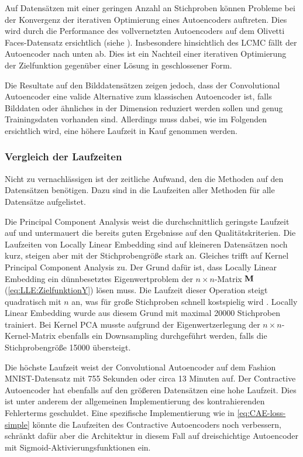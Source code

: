 Auf Datensätzen mit einer geringen Anzahl an Stichproben können Probleme bei der Konvergenz der iterativen Optimierung eines Autoencoders auftreten. Dies wird durch die Performance des vollvernetzten Autoencoders auf dem Olivetti Faces-Datensatz ersichtlich (siehe ). Insbesondere hinsichtlich des LCMC fällt der Autoencoder nach unten ab. Dies ist ein Nachteil einer iterativen Optimierung der Zielfunktion gegenüber einer Lösung in geschlossener Form.

Die Resultate auf den Bilddatensätzen zeigen jedoch, dass der Convolutional Autoencoder eine valide
Alternative zum klassischen Autoencoder ist, falls Bilddaten oder ähnliches in der Dimension
reduziert werden sollen und genug Trainingsdaten vorhanden sind. Allerdings muss dabei, wie im
Folgenden ersichtlich wird, eine höhere Laufzeit in Kauf genommen werden.

\subsubsection{Vergleich der Laufzeiten}

Nicht zu vernachlässigen ist der zeitliche Aufwand, den die Methoden auf den Datensätzen benötigen.
Dazu sind in  die Laufzeiten aller Methoden für alle Datensätze
aufgelistet.


Die Principal Component Analysis weist die durchschnittlich geringste Laufzeit auf und untermauert die bereits guten Ergebnisse auf den Qualitätskriterien. Die Laufzeiten von Locally Linear Embedding sind auf kleineren Datensätzen noch kurz, steigen aber mit der Stichprobengröße stark an. Gleiches trifft auf Kernel Principal Component Analysis zu. Der Grund dafür ist, dass Locally Linear Embedding ein dünnbesetztes Eigenwertproblem der $n \times n$-Matrix $\mathbf{M}$ (\eqref{eq:LLE:ZielfunktionY}) lösen muss. Die Laufzeit dieser Operation steigt quadratisch mit $n$ an, was für große Stichproben schnell kostspielig wird \parencite[9]{Saul.2000}. Locally Linear Embedding wurde aus diesem Grund mit maximal \num{20000}
Stichproben trainiert. Bei Kernel PCA musste aufgrund der Eigenwertzerlegung der $n \times
	n$-Kernel-Matrix ebenfalls ein Downsampling durchgeführt werden, falls die Stichprobengröße
\num{15000} übersteigt.

Die höchste Laufzeit weist der Convolutional Autoencoder auf dem Fashion MNIST-Datensatz mit 755
Sekunden oder circa 13 Minuten auf. Der Contractive Autoencoder hat ebenfalls auf den größeren
Datensätzen eine hohe Laufzeit. Dies ist unter anderem der allgemeinen Implementierung des
kontrahierenden Fehlerterms geschuldet. Eine spezifische Implementierung wie in
\eqref{eq:CAE-loss-simple} könnte die Laufzeiten des Contractive Autoencoders noch verbessern,
schränkt dafür aber die Architektur in diesem Fall auf dreischichtige Autoencoder mit
Sigmoid-Aktivierungsfunktionen ein.

